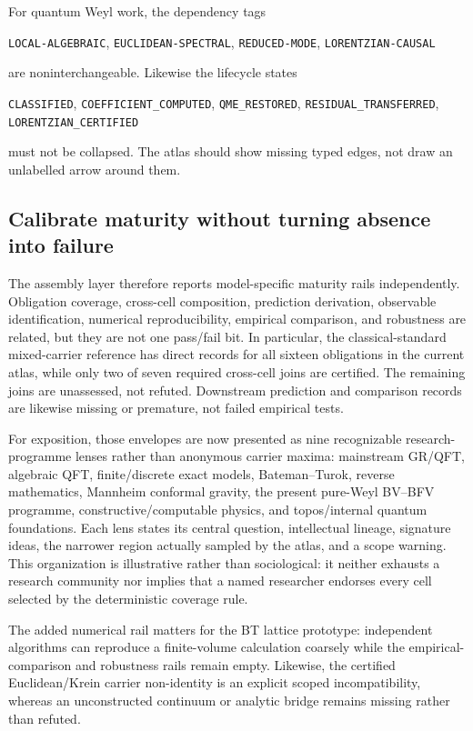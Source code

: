 \documentclass[11pt]{article}
\theoremstyle{definition}
\theoremstyle{remark}
\newcommand{\rtype}[1]{\nolinkurl{#1}}
\begin{document}
For quantum Weyl work, the dependency tags
\begin{center}
\rtype{LOCAL-ALGEBRAIC}, \quad
\rtype{EUCLIDEAN-SPECTRAL}, \quad
\rtype{REDUCED-MODE}, \quad
\rtype{LORENTZIAN-CAUSAL}
\end{center}
are noninterchangeable.  Likewise the lifecycle states
\begin{center}
\rtype{CLASSIFIED},
\rtype{COEFFICIENT_COMPUTED},
\rtype{QME_RESTORED},
\rtype{RESIDUAL_TRANSFERRED},
\rtype{LORENTZIAN_CERTIFIED}
\end{center}
must not be collapsed.  The atlas should show missing typed edges, not draw an
unlabelled arrow around them.

\subsection{Calibrate maturity without turning absence into failure}

The assembly layer therefore reports model-specific maturity rails independently.
Obligation coverage, cross-cell composition, prediction derivation,
observable identification, numerical reproducibility, empirical comparison,
and robustness are related,
but they are not one pass/fail bit.  In particular, the classical-standard
mixed-carrier reference has direct records for all sixteen obligations in the
current atlas, while only two of seven required cross-cell joins are
certified.  The remaining joins are unassessed, not refuted.  Downstream
prediction and comparison records are likewise missing or premature, not
failed empirical tests.

For exposition, those envelopes are now presented as nine recognizable
research-programme lenses rather than anonymous carrier maxima: mainstream
GR/QFT, algebraic QFT, finite/discrete exact models, Bateman--Turok, reverse
mathematics, Mannheim conformal gravity, the present pure-Weyl BV--BFV
programme, constructive/computable physics, and topos/internal quantum
foundations.  Each lens states its central question, intellectual lineage,
signature ideas, the narrower region actually sampled by the atlas, and a
scope warning.  This organization is illustrative rather than sociological:
it neither exhausts a research community nor implies that a named researcher
endorses every cell selected by the deterministic coverage rule.

The added numerical rail matters for the BT lattice prototype: independent
algorithms can reproduce a finite-volume calculation coarsely while the
empirical-comparison and robustness rails remain empty.  Likewise, the
certified Euclidean/Krein carrier non-identity is an explicit scoped
incompatibility, whereas an unconstructed continuum or analytic bridge remains
missing rather than refuted.
\end{document}
